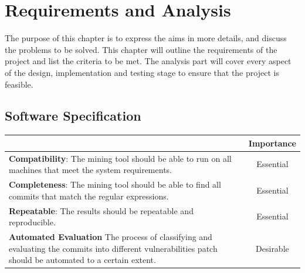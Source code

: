 \documentclass[12pt, a4paper]{report}
\begin{document}
\chapter{Requirements and Analysis}
The purpose of this chapter is to express the aims in more details, and discuss the problems to be
solved. This chapter will outline the requirements of the project and list the criteria to be met.
The analysis part will cover every aspect of the design, implementation and testing stage to ensure
that the project is feasible.

\section{Software Specification}

\begin{table}[H]
	\begin{center}
		\begin{tabular}{|p{9.5cm}|c|}
			\hline
			\rowcolor[HTML]{D8D8D8}
			\multicolumn{1}{|c|}{Criteria} & Importance \\ \hline
			\textbf{Compatibility}: The mining tool should be able to run on all machines that meet the
			system requirements. & Essential \\ \hline
			\textbf{Completeness}: The mining tool should be able to find all commits that match the
			regular expressions. & Essential \\ \hline
			\textbf{Repeatable}: The results should be repeatable and reproducible. & Essential \\ \hline
			\textbf{Automated Evaluation} The process of classifying and evaluating the commits into
			different vulnerabilities patch should be automated to a certain extent. & Desirable \\ \hline
			\end{tabular}
		 \label{table:criteria}
	\end{center}
\end{table}


\end{document}

